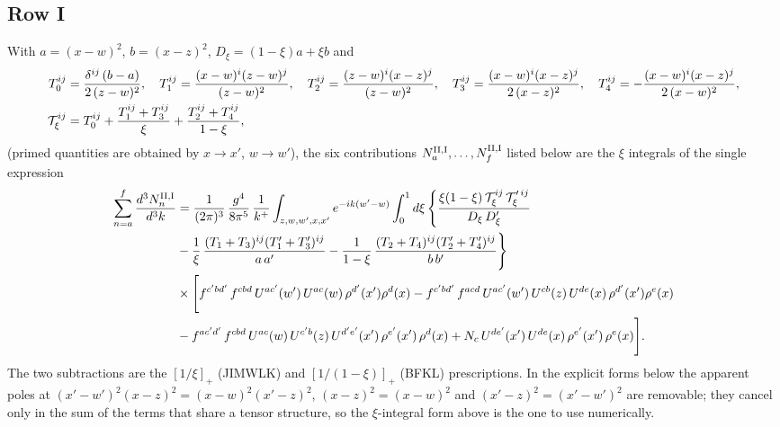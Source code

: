 \documentclass[9pt]{article}
\numberwithin{equation}{section}
\begin{document}
\subsection{Row I}
With $a=(x-w)^{2}$, $b=(x-z)^{2}$, $D_{\xi}=(1-\xi)a+\xi b$ and
\begin{align}
T_{0}^{ij}&=\frac{\delta^{ij}\,(b-a)}{2\,(z-w)^{2}},\quad
T_{1}^{ij}=\frac{(x-w)^{i}(z-w)^{j}}{(z-w)^{2}},\quad
T_{2}^{ij}=\frac{(z-w)^{i}(x-z)^{j}}{(z-w)^{2}},\quad
T_{3}^{ij}=\frac{(x-w)^{i}(x-z)^{j}}{2\,(x-z)^{2}},\quad
T_{4}^{ij}=-\frac{(x-w)^{i}(x-z)^{j}}{2\,(x-w)^{2}},\notag\\
\mathcal{T}_{\xi}^{ij}&=T_{0}^{ij}+\frac{T_{1}^{ij}+T_{3}^{ij}}{\xi}+\frac{T_{2}^{ij}+T_{4}^{ij}}{1-\xi},
\end{align}
(primed quantities are obtained by $x\to x'$, $w\to w'$), the six contributions $N^{\rm II,I}_{a},\dots,N^{\rm II,I}_{f}$ listed below are the $\xi$ integrals of the single expression
\begin{align}
\sum_{n=a}^{f}\frac{d^{3}N^{\rm II,I}_{n}}{d^{3}k}&=\frac{1}{(2\pi)^{3}}\,\frac{g^{4}}{8\pi^{5}}\,\frac{1}{k^{+}}\int_{z,w,w',x,x'}e^{-ik(w'-w)}\int_{0}^{1}d\xi\,\Bigg\{\frac{\xi(1-\xi)\,\mathcal{T}_{\xi}^{ij}\,\mathcal{T}_{\xi}^{\prime\,ij}}{D_{\xi}\,D'_{\xi}}\notag\\
&-\frac{1}{\xi}\,\frac{(T_{1}+T_{3})^{ij}(T'_{1}+T'_{3})^{ij}}{a\,a'}
-\frac{1}{1-\xi}\,\frac{(T_{2}+T_{4})^{ij}(T'_{2}+T'_{4})^{ij}}{b\,b'}\Bigg\}\notag\\
&\times\Bigg[f^{c'bd'}\,f^{cbd}\, U^{ac'}(w')\,U^{ac}(w)\,\rho^{d'}(x')\rho^{d}(x)- f^{c'bd'}\,f^{acd}\,U^{ac'}(w')\,U^{cb}(z)\,U^{de}(x)\,\rho^{d'}(x')\rho^{e}(x) \notag \\ & -f^{ac'd'}\,f^{cbd}\,U^{ac}(w)\,U^{c'b}(z)\,U^{d'e'}(x')\,\rho^{e'}(x')\,\rho^{d}(x) +N_{c}\,U^{de'}(x')\,U^{de}(x)\,\rho^{e'}(x')\,\rho^{e}(x)\Bigg].
\end{align}
The two subtractions are the $[1/\xi]_{+}$ (JIMWLK) and $[1/(1-\xi)]_{+}$ (BFKL) prescriptions. In the explicit forms below the apparent poles at $(x'-w')^{2}(x-z)^{2}=(x-w)^{2}(x'-z)^{2}$, $(x-z)^{2}=(x-w)^{2}$ and $(x'-z)^{2}=(x'-w')^{2}$ are removable; they cancel only in the sum of the terms that share a tensor structure, so the $\xi$-integral form above is the one to use numerically.
\end{document}
